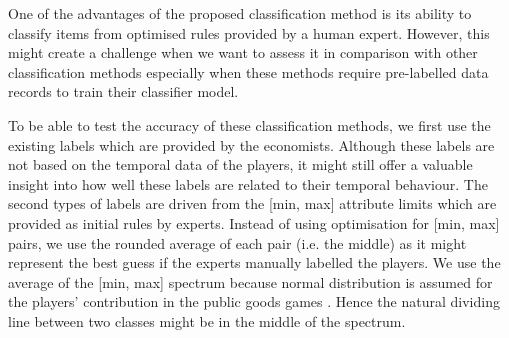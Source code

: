 One of the advantages of the proposed classification method is its ability to classify items from optimised rules provided by a human expert. However, this might create a challenge when we want to assess it in comparison with other classification methods especially when these methods require pre-labelled data records to train their classifier model.

To be able to test the accuracy of these classification methods, we first use the existing labels which are provided by the economists. Although these labels are not based on the temporal data of the players, it might still offer a valuable insight into how well these labels are related to their temporal behaviour. The second types of labels are driven from the [min, max] attribute limits which are provided as initial rules by experts.  Instead of using optimisation for [min, max] pairs, we use the rounded average of each pair (i.e. the middle) as it might represent the best guess if the experts manually labelled the players. We use the average of the [min, max] spectrum because normal distribution is assumed for the players' contribution in the public goods games \cite{Itaya2010, Anderson1998}. Hence the natural dividing line between two classes might be in the middle of the spectrum.


